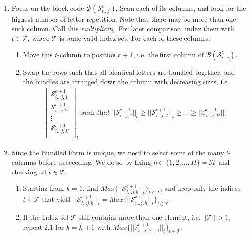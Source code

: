 \documentclass[12pt]{article}  %
\begin{document}
\begin{enumerate}
\item Focus on the block code $\mathcal{B}(\mathcal{S}^c_{i \dots j})$. Scan each of its columns, and look for the highest number of letter-repetition. Note that there may be more than one such column. Call this \emph{multiplicity}. For later comparison, index them with $t \in \mathcal{T}$, where $\mathcal{T}$ is some valid index set. For each of these columns:

\begin{enumerate}
\item Move this $t$-column to position $c+1$, i.e. the first column of $\mathcal{B}(\mathcal{S}^c_{i \dots j})$.
\item Swap the rows such that all identical letters are bundled together, and the bundles are arranged down the column with decreasing sizes, i.e.
\begin{align}\label{eq:col}
\left[\begin{array}{c}
\mathcal{S}^{c+1}_{i \dots j,1}\\
\mathcal{S}^{c+1}_{i \dots j,2}\\
\vdots \\
\mathcal{S}^{c+1}_{i \dots j,H}\\
\end{array}\right]_t
\textit{ such that \ }
||\mathcal{S}^{c+1}_{i \dots j,1}||_t \geq
||\mathcal{S}^{c+1}_{i \dots j,2}||_t \geq
\dots \geq
||\mathcal{S}^{c+1}_{i \dots j,H}||_t
\end{align}

\end{enumerate}


\item Since the Bundled Form is unique, we need to select some of the many $t$-columns before proceeding. We do so by fixing $h \in \{1,2,\dots,H\} = \mathcal{H}$ and checking all $t \in \mathcal{T}$:

\begin{enumerate}
\item Starting from $h=1$, find $Max \{||\mathcal{S}^{c+1}_{i \dots j,h}||_t\}_{t\in\mathcal{T}}$, and keep only the indices $t \in \mathcal{T}$ that yield $||\mathcal{S}^{c+1}_{i \dots j,h}||_t = Max \{||\mathcal{S}^{c+1}_{i \dots j,h}||_t\}_{t\in\mathcal{T}}$.

\item If the index set $\mathcal{T}$ still contains more than one element, i.e. $||\mathcal{T}||>1$, repeat 2.1 for $h=h+1$ with $Max \{||\mathcal{S}^{c+1}_{i \dots j,h+1}||_t\}_{t\in\mathcal{T}}$.






\end{enumerate}
\end{enumerate}
\end{document}
